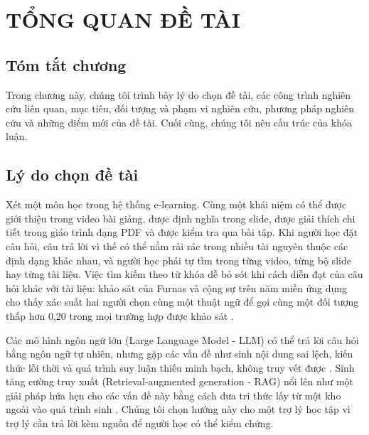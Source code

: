 \chapter{TỔNG QUAN ĐỀ TÀI}\label{Chapter1}

\section*{Tóm tắt chương}

Trong chương này, chúng tôi trình bày lý do chọn đề tài, các công trình nghiên cứu liên quan, mục tiêu, đối tượng và phạm vi nghiên cứu, phương pháp nghiên cứu và những điểm mới của đề tài. Cuối cùng, chúng tôi nêu cấu trúc của khóa luận.


\section{Lý do chọn đề tài}

Xét một môn học trong hệ thống e-learning. Cùng một khái niệm có thể được giới thiệu trong video bài giảng, được định nghĩa trong slide, được giải thích chi tiết trong giáo trình dạng PDF và được kiểm tra qua bài tập. Khi người học đặt câu hỏi, câu trả lời vì thế có thể nằm rải rác trong nhiều tài nguyên thuộc các định dạng khác nhau, và người học phải tự tìm trong từng video, từng bộ slide hay từng tài liệu. Việc tìm kiếm theo từ khóa dễ bỏ sót khi cách diễn đạt của câu hỏi khác với tài liệu: khảo sát của Furnas và cộng sự trên năm miền ứng dụng cho thấy xác suất hai người chọn cùng một thuật ngữ để gọi cùng một đối tượng thấp hơn 0,20 trong mọi trường hợp được khảo sát \cite{furnas1987vocabulary}.

\bigbreak\noindent
Các mô hình ngôn ngữ lớn (Large Language Model - LLM) có thể trả lời câu hỏi bằng ngôn ngữ tự nhiên, nhưng gặp các vấn đề như sinh nội dung sai lệch, kiến thức lỗi thời và quá trình suy luận thiếu minh bạch, không truy vết được \cite{gao2023ragsurvey}. Sinh tăng cường truy xuất (Retrieval-augmented generation - RAG) nổi lên như một giải pháp hứa hẹn cho các vấn đề này bằng cách đưa tri thức lấy từ một kho ngoài vào quá trình sinh \cite{lewis2020rag, gao2023ragsurvey}. Chúng tôi chọn hướng này cho một trợ lý học tập vì trợ lý cần trả lời kèm nguồn để người học có thể kiểm chứng.

